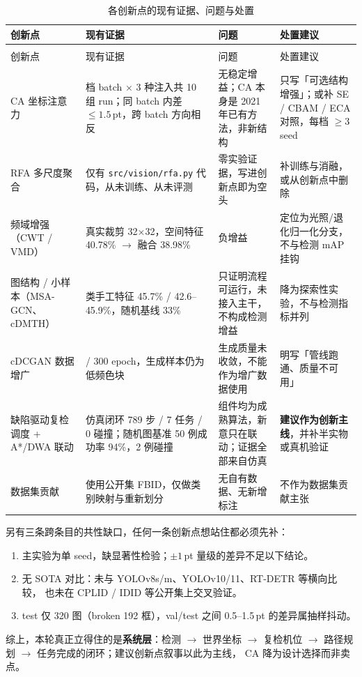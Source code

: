 \documentclass[UTF8,a4paper,11pt]{ctexart}
\begin{document}
\begin{footnotesize}
\begin{longtable}{@{}>{\raggedright\arraybackslash}p{2.15cm}
                     >{\raggedright\arraybackslash}p{3.95cm}
                     >{\raggedright\arraybackslash}p{4.05cm}
                     >{\raggedright\arraybackslash}p{3.45cm}@{}}
\caption{各创新点的现有证据、问题与处置}\label{tab:novelty}\\
\toprule
创新点 & 现有证据 & 问题 & 处置建议 \\
\midrule
\endfirsthead
\multicolumn{4}{@{}l}{\footnotesize 表~\thetable（续）}\\[2pt]
\toprule
创新点 & 现有证据 & 问题 & 处置建议 \\
\midrule
\endhead
\bottomrule
\endfoot
CA 坐标注意力
  & 3 档 batch × 3 种注入共 10 组 run；同 batch 内差 $\le 1.5$\,pt，跨 batch 方向相反
  & 无稳定增益；CA 本身是 2021 年已有方法，非新结构
  & 只写「可选结构增强」；或补 SE / CBAM / ECA 对照，每档 $\ge 3$ seed \\
\addlinespace
RFA 多尺度聚合
  & 仅有 \texttt{src/vision/rfa.py} 代码，从未训练、从未评测
  & 零实验证据，写进创新点即为空头
  & 补训练与消融，或从创新点中删除 \\
\addlinespace
频域增强（CWT / VMD）
  & 真实裁剪 32$\times$32，空间特征 40.78\% $\rightarrow$ 融合 38.98\%
  & 负增益
  & 定位为光照/退化归一化分支，不与检测 mAP 挂钩 \\
\addlinespace
图结构 / 小样本（MSA-GCN、cDMTH）
  & 3 类手工特征 45.7\% / 42.6--45.9\%，随机基线 33\%
  & 只证明流程可运行，未接入主干，不构成检测增益
  & 降为探索性实验，不与检测指标并列 \\
\addlinespace
cDCGAN 数据增广
  & 60 / 300 epoch，生成样本仍为低频色块
  & 生成质量未收敛，不能作为增广数据使用
  & 明写「管线跑通、质量不可用」 \\
\addlinespace
缺陷驱动复检调度 + A*/DWA 联动
  & 仿真闭环 789 步 / 7 任务 / 0 碰撞；随机图基准 50 例成功率 94\%，2 例碰撞
  & 组件均为成熟算法，新意只在联动；证据全部来自仿真
  & \textbf{建议作为创新主线}，并补半实物或真机验证 \\
\addlinespace
数据集贡献
  & 使用公开集 FBID，仅做类别映射与重新划分
  & 无自有数据、无新增标注
  & 不作为数据集贡献主张 \\
\end{longtable}
\end{footnotesize}

\noindent 另有三条跨条目的共性缺口，任何一条创新点想站住都必须先补：

\begin{enumerate}[label=(\arabic*)]
  \item 主实验为单 seed，缺显著性检验；$\pm1$\,pt 量级的差异不足以下结论。
  \item 无 SOTA 对比：未与 YOLOv8s/m、YOLOv10/11、RT-DETR 等横向比较，
        也未在 CPLID / IDID 等公开集上交叉验证。
  \item test 仅 320 图（broken 192 框），val/test 之间 0.5--1.5\,pt 的差异属抽样抖动。
\end{enumerate}

\noindent 综上，本轮真正立得住的是\textbf{系统层}：检测 $\rightarrow$ 世界坐标 $\rightarrow$
复检机位 $\rightarrow$ 路径规划 $\rightarrow$ 任务完成的闭环；建议创新点叙事以此为主线，
CA 降为设计选择而非卖点。
\end{document}
